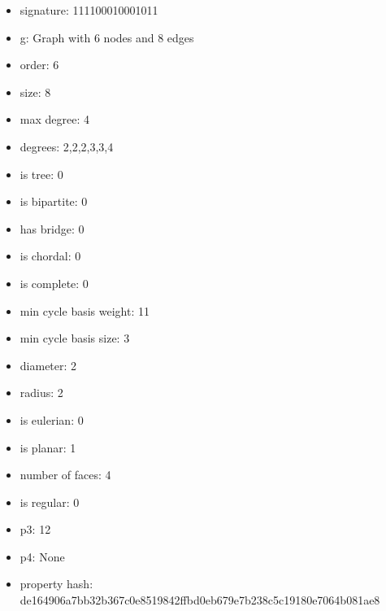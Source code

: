 \begin{itemize}
\item signature: 111100010001011
\item g: Graph with 6 nodes and 8 edges
\item order: 6
\item size: 8
\item max degree: 4
\item degrees: 2,2,2,3,3,4
\item is tree: 0
\item is bipartite: 0
\item has bridge: 0
\item is chordal: 0
\item is complete: 0
\item min cycle basis weight: 11
\item min cycle basis size: 3
\item diameter: 2
\item radius: 2
\item is eulerian: 0
\item is planar: 1
\item number of faces: 4
\item is regular: 0
\item p3: 12
\item p4: None
\item property hash: de164906a7bb32b367c0e8519842ffbd0eb679e7b238c5c19180e7064b081ae8
\end{itemize}
\newpage
\begin{figure}
\end{figure}
